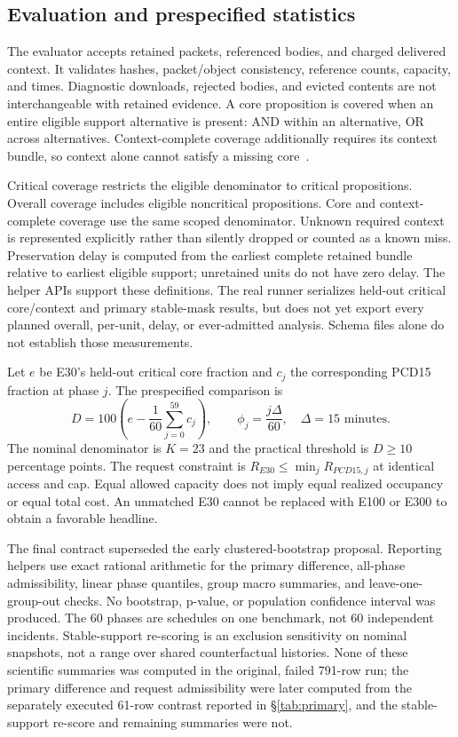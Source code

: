 \documentclass[11pt]{article}
\begin{document}
\subsection{Evaluation and prespecified statistics}
The evaluator accepts retained packets, referenced bodies, and charged delivered context. It validates hashes, packet/object consistency, reference counts, capacity, and times. Diagnostic downloads, rejected bodies, and evicted contents are not interchangeable with retained evidence. A core proposition is covered when an entire eligible support alternative is present: AND within an alternative, OR across alternatives. Context-complete coverage additionally requires its context bundle, so context alone cannot satisfy a missing core~\cite{code}.

Critical coverage restricts the eligible denominator to critical propositions. Overall coverage includes eligible noncritical propositions. Core and context-complete coverage use the same scoped denominator. Unknown required context is represented explicitly rather than silently dropped or counted as a known miss. Preservation delay is computed from the earliest complete retained bundle relative to earliest eligible support; unretained units do not have zero delay. The helper APIs support these definitions. The real runner serializes held-out critical core/context and primary stable-mask results, but does not yet export every planned overall, per-unit, delay, or ever-admitted analysis. Schema files alone do not establish those measurements.

Let $e$ be E30's held-out critical core fraction and $c_j$ the corresponding PCD15 fraction at phase $j$. The prespecified comparison is
\begin{equation}
D=100\left(e-\frac{1}{60}\sum_{j=0}^{59}c_j\right),\qquad
\phi_j=\frac{j\Delta}{60},\quad \Delta=15\text{ minutes}.
\end{equation}
The nominal denominator is $K=23$ and the practical threshold is $D\geq10$ percentage points. The request constraint is $R_{E30}\leq\min_jR_{PCD15,j}$ at identical access and cap. Equal allowed capacity does not imply equal realized occupancy or equal total cost. An unmatched E30 cannot be replaced with E100 or E300 to obtain a favorable headline.

The final contract superseded the early clustered-bootstrap proposal. Reporting helpers use exact rational arithmetic for the primary difference, all-phase admissibility, linear phase quantiles, group macro summaries, and leave-one-group-out checks. No bootstrap, p-value, or population confidence interval was produced. The 60 phases are schedules on one benchmark, not 60 independent incidents. Stable-support re-scoring is an exclusion sensitivity on nominal snapshots, not a range over shared counterfactual histories. None of these scientific summaries was computed in the original, failed 791-row run; the primary difference and request admissibility were later computed from the separately executed 61-row contrast reported in \S\ref{tab:primary}, and the stable-support re-score and remaining summaries were not.
\end{document}
